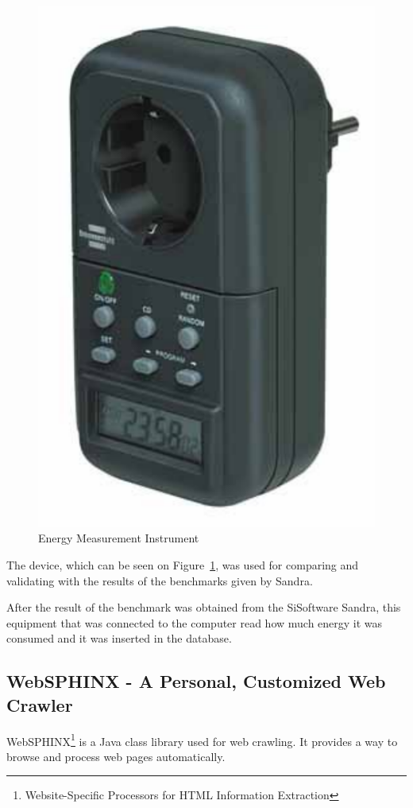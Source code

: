     \begin{figure}[!htb]
        \centering
            \includegraphics[scale=0.6]{graphics/energy_measurement_instrument}
            \caption{Energy Measurement Instrument}
            \label{fig:energy_measurement_instrument}
    \end{figure}
The device, which can be seen on Figure~\ref{fig:energy_measurement_instrument}, was used for comparing and validating with the results of the benchmarks given by Sandra.

After the result of the benchmark was obtained from the SiSoftware Sandra, this equipment that was connected to the computer read how much energy it was consumed and it was inserted in the database.
\subsection{WebSPHINX - A Personal, Customized Web Crawler} \label{sec3:websphinx}
    WebSPHINX\footnote{Website-Specific Processors for HTML Information Extraction} is a Java class library used for web crawling. It provides a way to browse and process web pages automatically.
    
